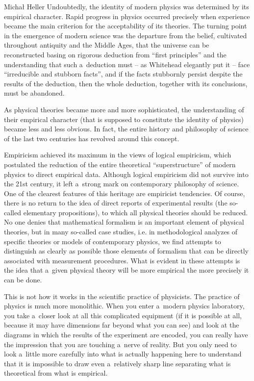 \begin{editorialeng}{Michał Heller}
Undoubtedly, the identity of modern physics was determined by its empirical character. Rapid progress in physics occurred precisely when experience became the main criterion for the acceptability of its theories. The turning point in the emergence of modern science was the departure from the belief, cultivated throughout antiquity and the Middle Ages, that the universe can be reconstructed basing on rigorous deduction from ``first principles'' and the understanding that such a~deduction must -- as Whitehead elegantly put it -- face ``irreducible and stubborn facts'', and if the facts stubbornly persist despite the results of the deduction, then the whole deduction, together with its conclusions, must be abandoned.

As physical theories became more and more sophisticated, the understanding of their empirical character (that is supposed to constitute the identity of physics) became less and less obvious. In fact, the entire history and philosophy of science of the last two centuries has revolved around this concept.

Empiricism achieved its maximum in the views of logical empiricism, which postulated the reduction of the entire theoretical ``superstructure'' of modern physics to direct empirical data. Although logical empiricism did not survive into the 21st century, it left a~strong mark on contemporary philosophy of science. One of the clearest features of this heritage are empiricist tendencies. Of course, there is no return to the idea of direct reports of experimental results (the so-called elementary propositions), to which all physical theories should be reduced. No one denies that mathematical formalism is an important element of physical theories, but in many so-called case studies, i.e. in methodological analyzes of specific theories or models of contemporary physics, we find attempts to distinguish as clearly as possible those elements of formalism that can be directly associated with measurement procedures. What is evident in these attempts is the idea that a~given physical theory will be more empirical the more precisely it can be done.

This is not how it works in the scientific practice of physicists. The practice of physics is much more monolithic. When you enter a~modern physics laboratory, you take a~closer look at all this complicated equipment (if it is possible at all, because it may have dimensions far beyond what you can see) and look at the diagrams in which the results of the experiment are encoded, you can really have the impression that you are touching a~nerve of reality. But you only need to look a~little more carefully into what is actually happening here to understand that it is impossible to draw even a~relatively sharp line separating what is theoretical from what is empirical.


\end{editorialeng}
